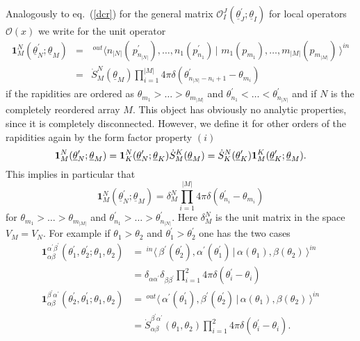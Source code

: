\documentclass[a4paper,a4paper]{article}
\begin{document}
Analogously to eq.~(\ref{dcr}) for the general matrix $\mathcal{O}_{I}^{J}(%
\underline{\theta }_{J}^{\prime };\underline{\theta }_{I})$ for local
operators $\mathcal{O}(x)$ we write for the unit operator 
\begin{eqnarray*}
\mathbf{1}_{M}^{N}(\underline{\theta }_{N}^{\prime };\underline{\theta }%
_{M}) &=&\,^{out}\langle n_{|N|}(\,p_{n_{|N|}}^{\prime }),\dots
,n_{1}(p_{n_{1}}^{\prime })\,|\,\,m_{1}(p_{m_{1}}),\dots
,m_{|M|}(p_{m_{|M|}})\,\rangle ^{in} \\
&=&\dot{S}_{M}^{N}(\underline{\theta }_{M})\prod_{i=1}^{|M|}4\pi \delta
(\theta _{n_{|N|}-n_{i}+1}^{\prime }-\theta _{m_{i}})
\end{eqnarray*}
if the rapidities are ordered as $\theta _{m_{1}}>\dots >\theta _{m_{|M|}}$
and $\theta _{n_{1}}^{\prime }<\dots <\theta _{n_{|N|}}^{\prime }$ and if $N$
is the completely reordered array $M$. This object has obviously no analytic
properties, since it is completely disconnected. However, we define it for
other orders of the rapidities again by the form factor property $(i)$ 
\[
\mathbf{1}_{M}^{N}(\underline{\theta }_{N}^{\prime };\underline{\theta }%
_{M})=\mathbf{1}_{K}^{N}(\underline{\theta }_{N}^{\prime };\underline{\theta 
}_{K})\dot{S}_{M}^{K}(\underline{\theta }_{M})=\dot{S}_{K}^{N}(\underline{%
\theta }_{K}^{\prime })\mathbf{1}_{M}^{K}(\underline{\theta }_{K}^{\prime };%
\underline{\theta }_{M}). 
\]
This implies in particular that 
\[
\mathbf{1}_{M}^{N}(\underline{\theta }_{N}^{\prime };\underline{\theta }%
_{M})=\delta _{M}^{N}\prod_{i=1}^{|M|}4\pi \delta (\theta _{n_{i}}^{\prime
}-\theta _{m_{i}}) 
\]
for $\theta _{m_{1}}>\dots >\theta _{m_{|M|}}$ and $\theta _{n_{1}}^{\prime
}>\dots >\theta _{n_{|N|}}^{\prime }$. Here $\delta _{M}^{N}$ is the unit
matrix in the space $V_{M}=V_{N}$. For example if $\theta _{1}>\theta _{2}$
and $\theta _{1}^{\prime }>\theta _{2}^{\prime }$ one has the two cases 
\begin{align*}
\mathbf{1}_{\alpha \beta }^{\alpha ^{\prime }\beta ^{\prime }}(\theta
_{1}^{\prime },\theta _{2}^{\prime };\theta _{1},\theta _{2})&
=\,^{in}\langle \,\beta ^{\prime }(\theta _{2}^{\prime }),\alpha ^{\prime
}(\theta _{1}^{\prime })\,|\,\alpha (\theta _{1}),\beta (\theta
_{2})\,\rangle ^{in} \\
& =\delta _{\alpha \alpha ^{\prime }}\delta _{\beta \beta ^{\prime
}}\prod_{i=1}^{2}4\pi \delta (\theta _{i}^{\prime }-\theta _{i}) \\
\mathbf{1}_{\alpha \beta }^{\beta ^{\prime }\alpha ^{\prime }}(\theta
_{2}^{\prime },\theta _{1}^{\prime };\theta _{1},\theta _{2})&
=\,^{out}\langle \,\alpha ^{\prime }(\theta _{1}^{\prime }),\beta ^{\prime
}(\theta _{2}^{\prime })\,|\,\alpha (\theta _{1}),\beta (\theta
_{2})\,\rangle ^{in} \\
& =\dot{S}_{\alpha \beta }^{\beta ^{\prime }\alpha ^{\prime }}(\theta
_{1},\theta _{2})\prod_{i=1}^{2}4\pi \delta (\theta _{i}^{\prime }-\theta
_{i}).
\end{align*}
\end{document}
